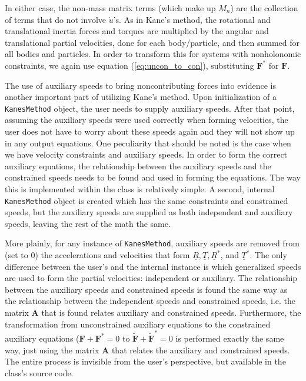 \documentclass[twocolumn,10pt]{asme2e}
\begin{document}
In either case, the non-mass matrix terms (which make up $M_n$) are the
collection of terms that do not involve $\dot{u}$'s.
As in Kane's method, the rotational and translational inertia forces and
torques are multiplied by the angular and translational partial velocities,
done for each body/particle, and then summed for all bodies and particles.
In order to transform this for systems with nonholonomic constraints, we again
use equation (\ref{eq:uncon_to_con}), substituting $\mathbf{F}^*$ for
$\mathbf{F}$.

The use of auxiliary speeds to bring noncontributing forces into evidence is
another important part of utilizing Kane's method.
Upon initialization of a \verb|KanesMethod| object, the user needs to supply
auxiliary speeds.
After that point, assuming the auxiliary speeds were used correctly when
forming velocities, the user does not have to worry about these speeds again
and they will not show up in any output equations.
One peculiarity that should be noted is the case when we have velocity
constraints and auxiliary speeds.
In order to form the correct auxiliary equations, the relationship between the
auxiliary speeds and the constrained speeds needs to be found and used in
forming the equations.
The way this is implemented within the class is relatively simple.
A second, internal \verb|KanesMethod| object is created which has the same
constraints and constrained speeds, but the auxiliary speeds are supplied as
both independent and auxiliary speeds, leaving the rest of the math the same.

More plainly, for any instance of \verb|KanesMethod|, auxiliary speeds are
removed from (set to 0) the accelerations and velocities that form
$\underline{R}, \underline{T}, \underline{R}^*$, and $\underline{T}^*$.
The only difference between the user's and the internal instance is which
generalized speeds are used to form the partial velocities: independent or
auxiliary.
The relationship between the auxiliary speeds and constrained speeds is found
the same way as the relationship between the independent speeds and constrained
speeds, i.e. the matrix $\mathbf{A}$ that is found relates auxiliary and
constrained speeds.
Furthermore, the transformation from unconstrained auxiliary equations to the
constrained auxiliary equations ($\mathbf{F} + \mathbf{F}^*=0$ to
$\tilde{\mathbf{F}} + \tilde{\mathbf{F}}^* = 0$ is performed exactly the same
way, just using the matrix $\mathbf{A}$ that relates the auxiliary and
constrained speeds.
The entire process is invisible from the user's perspective, but available in
the class's source code.
\end{document}
